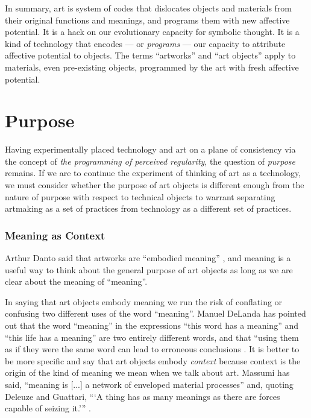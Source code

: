 \documentclass[letterpaper]{article}
\begin{document}
    In summary, art is system of codes that dislocates objects and materials from their original functions and meanings, and programs them with new affective potential. It is a hack on our evolutionary capacity for symbolic thought. It is a kind of technology that encodes — or \emph{programs} — our capacity to attribute affective potential to objects. The terms “artworks” and “art objects” apply to materials, even pre-existing objects, programmed by the art with fresh affective potential.
    
\section{Purpose}

    Having experimentally placed technology and art on a plane of consistency via the concept of \emph{the programming of perceived regularity}, the question of \emph{purpose} remains. If we are to continue the experiment of thinking of art as a technology, we must consider whether the purpose of art objects is different enough from the nature of purpose with respect to technical objects to warrant separating artmaking as a set of practices from technology as a different set of practices.
    
    \subsubsection{Meaning as Context}

    Arthur Danto said that artworks are “embodied meaning” \citep[p.125]{DantoEmbdMnngs2007}, and meaning is a useful way to think about the general purpose of art objects as long as we are clear about the meaning of “meaning”.
    
    In saying that art objects embody meaning we run the risk of conflating or confusing two different uses of the word “meaning”. Manuel DeLanda has pointed out that the word “meaning” in the expressions “this word has a meaning” and “this life has a meaning” are two entirely different words, and that “using them as if they were the same word can lead to erroneous conclusions \citep[pp.40-41]{DeLandaCsltyAndMnng2018}. It is better to be more specific and say that art objects embody \emph{context} because context is the origin of the kind of meaning we mean when we talk about art. Massumi has said, “meaning is [...] a network of enveloped material processes” and, quoting Deleuze and Guattari, “‘A thing has as many meanings as there are forces capable of seizing it.’” \citep[p.10]{MassumiAUsrsGdTCptlsmAndSchzphrn1992}.
\end{document}
